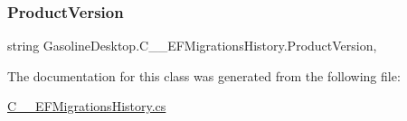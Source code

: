 \subsubsection{\texorpdfstring{ProductVersion}{ProductVersion}}
{\footnotesize\ttfamily string Gasoline\+Desktop.\+C\+\_\+\+\_\+\+E\+F\+Migrations\+History.\+Product\+Version\hspace{0.3cm}{\ttfamily [get]}, {\ttfamily [set]}}



The documentation for this class was generated from the following file\+:\begin{DoxyCompactItemize}
\item 
\mbox{\hyperlink{_c_____e_f_migrations_history_8cs}{C\+\_\+\+\_\+\+E\+F\+Migrations\+History.\+cs}}\end{DoxyCompactItemize}
